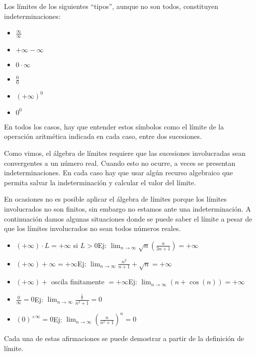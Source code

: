 \documentclass[../teoria.root.tex]{subfiles}
\begin{document}
Los límites de los siguientes “tipos”, aunque no son todos, constituyen indeterminaciones:
\begin{itemize}
	\item \(\frac{\infty}{\infty}\)
	\item \(+\infty-\infty\)
	\item \(0\cdot\infty\)
	\item \(\frac{0}{0}\)
	\item \((+\infty)^0\)
	\item \(0^0\)
\end{itemize}
En todos los casos, hay que entender estos símbolos como el límite de la operación aritmética indicada en cada caso, entre dos sucesiones.

Como vimos, el álgebra de límites requiere que las sucesiones involucradas sean convergentes a un número real.
Cuando esto no ocurre, a veces se presentan indeterminaciones.
En cada caso hay que usar algún recurso algebraico que permita salvar la indeterminación y calcular el valor del límite.

En ocasiones no es posible aplicar el álgebra de límites porque los límites involucrados no son finitos, sin embargo no estamos ante una indeterminación.
A continuación damos algunas situaciones donde se puede saber el límite a pesar de que los límites involucrados no sean todos números reales.
\begin{itemize}
	\item \((+\infty)\cdot L=+\infty\) si \(L>0\)\tab Ej:
	      \(\lim_{n\to\infty}\sqrt{n}\left(\frac{n}{3n+1}\right)=+\infty\)
	\item \((+\infty)+\infty=+\infty\)\tab Ej:
	      \(\lim_{n\to\infty}\frac{n^2}{n+1}+\sqrt{n}=+\infty\)
	\item \((+\infty)+\) oscila finitamente \(=+\infty\)\tab Ej:
	      \(\lim_{n\to\infty}(n+\cos(n))=+\infty\)
	\item \(\frac{0}{\infty}=0\)\tab Ej:
	      \(\lim_{n\to\infty}\frac{\frac{1}{n}}{n^2+1}=0\)
	\item \((0)^{+\infty}=0\)\tab Ej:
	      \(\lim_{n\to\infty}\left(\frac{n}{n^2+1}\right)^n=0\)
\end{itemize}
Cada una de estas afirmaciones se puede demostrar a partir de la definición de límite.
\end{document}
